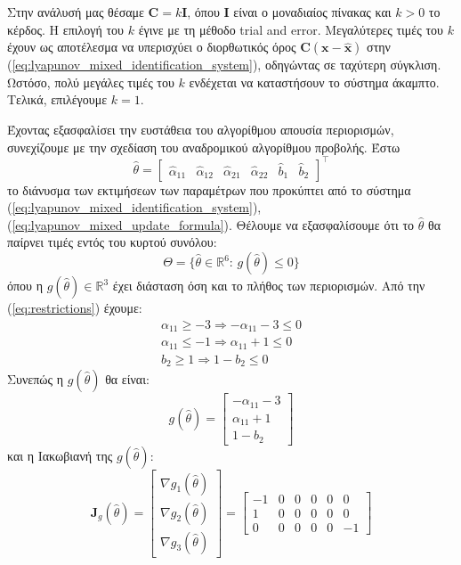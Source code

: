 \documentclass[a4paper,12pt]{article}
\begin{document}
Στην ανάλυσή μας θέσαμε $\mathbf{C} = k \mathbf{I}$, όπου $\mathbf{I}$ είναι ο μοναδιαίος πίνακας και 
$k > 0$ το κέρδος. Η επιλογή του $k$ έγινε με τη μέθοδο 
trial and error. Μεγαλύτερες τιμές του $k$ έχουν ως 
αποτέλεσμα να υπερισχύει ο διορθωτικός όρος $\mathbf{C}(\mathbf{x} - \hat{\mathbf{x}})$ στην 
(\ref{eq:lyapunov_mixed_identification_system}), οδηγώντας σε ταχύτερη σύγκλιση. Ωστόσο, πολύ μεγάλες 
τιμές του $k$ ενδέχεται να καταστήσουν το σύστημα άκαμπτο. Τελικά, επιλέγουμε $k = 1$.

Έχοντας εξασφαλίσει την ευστάθεια του αλγορίθμου απουσία περιορισμών, συνεχίζουμε με την σχεδίαση του
αναδρομικού αλγορίθμου προβολής. Έστω
\[
\hat{\theta} =
\begin{bmatrix}
    \hat{\alpha}_{11} & \hat{\alpha}_{12} & \hat{\alpha}_{21} & \hat{\alpha}_{22} & \hat{b}_1 & \hat{b}_2
\end{bmatrix}^{\top}
\]
το διάνυσμα των εκτιμήσεων των παραμέτρων που προκύπτει από το σύστημα (\ref{eq:lyapunov_mixed_identification_system}), (\ref{eq:lyapunov_mixed_update_formula}). 
Θέλουμε να εξασφαλίσουμε ότι το $\hat{\theta}$ θα παίρνει τιμές εντός του κυρτού συνόλου:
\[
\Theta = \{\hat{\theta} \in \mathbb{R}^6:\, g(\hat{\theta}) \leq 0\}
\]
όπου η $g(\hat{\theta}) \in \mathbb{R}^3$ έχει διάσταση όση και το πλήθος των περιορισμών.
Από την (\ref{eq:restrictions}) έχουμε:
\[
\begin{aligned}
    \alpha_{11} \ge -3 \Rightarrow - \alpha_{11} - 3 \le 0 \\
    \alpha_{11} \le -1 \Rightarrow \alpha_{11} + 1 \le 0 \\
    b_2 \ge 1 \Rightarrow 1 - b_2 \le 0
\end{aligned}
\]
Συνεπώς η $g(\hat{\theta})$ θα είναι:
\[
    g(\hat{\theta}) = 
    \begin{bmatrix}
        - \alpha_{11} - 3 \\
        \alpha_{11} + 1 \\
        1 - b_2
    \end{bmatrix}
\]
και η Ιακωβιανή της $g(\hat{\theta})$:
\[
    \mathbf{J}_g(\hat{\theta}) = 
    \begin{bmatrix}
         \nabla g_1(\hat{\theta}) \\
         \nabla g_2(\hat{\theta}) \\
         \nabla g_3(\hat{\theta})
    \end{bmatrix} = 
    \begin{bmatrix}
        -1 & 0 & 0 & 0 & 0 & 0 \\
        1 & 0 & 0 & 0 & 0 & 0 \\
        0 & 0 & 0 & 0 & 0 & -1
    \end{bmatrix}
\]
\end{document}
